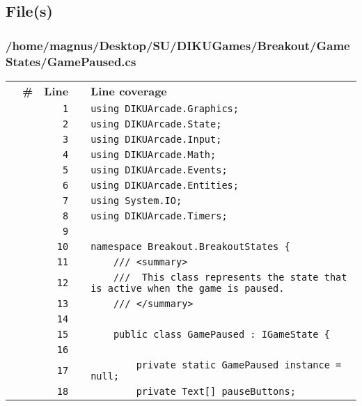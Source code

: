 \documentclass[a4paper,landscape,10pt]{article}
\begin{document}
\subsection{File(s)}
\subsubsection{/home/magnus/Desktop/SU/DIKUGames/Breakout/GameStates/GamePaused.cs}
\begin{longtable}[l]{lrrll}
\textbf{} & \textbf{\#} & \textbf{Line} & \textbf{} & \textbf{Line coverage}\\
\cellcolor{gray} &  & \verb~1~ & & \verb~using DIKUArcade.Graphics;~\\
\cellcolor{gray} &  & \verb~2~ & & \verb~using DIKUArcade.State;~\\
\cellcolor{gray} &  & \verb~3~ & & \verb~using DIKUArcade.Input;~\\
\cellcolor{gray} &  & \verb~4~ & & \verb~using DIKUArcade.Math;~\\
\cellcolor{gray} &  & \verb~5~ & & \verb~using DIKUArcade.Events;~\\
\cellcolor{gray} &  & \verb~6~ & & \verb~using DIKUArcade.Entities;~\\
\cellcolor{gray} &  & \verb~7~ & & \verb~using System.IO;~\\
\cellcolor{gray} &  & \verb~8~ & & \verb~using DIKUArcade.Timers;~\\
\cellcolor{gray} &  & \verb~9~ & & \verb~~\\
\cellcolor{gray} &  & \verb~10~ & & \verb~namespace Breakout.BreakoutStates {~\\
\cellcolor{gray} &  & \verb~11~ & & \verb~    /// <summary>~\\
\cellcolor{gray} &  & \verb~12~ & & \verb~    ///  This class represents the state that is active when the game is paused.~\\
\cellcolor{gray} &  & \verb~13~ & & \verb~    /// </summary>~\\
\cellcolor{gray} &  & \verb~14~ & & \verb~~\\
\cellcolor{gray} &  & \verb~15~ & & \verb~    public class GamePaused : IGameState {~\\
\cellcolor{gray} &  & \verb~16~ & & \verb~~\\
\cellcolor{gray} &  & \verb~17~ & & \verb~        private static GamePaused instance = null;~\\
\cellcolor{gray} &  & \verb~18~ & & \verb~        private Text[] pauseButtons;~\\

\end{longtable}
\end{document}
